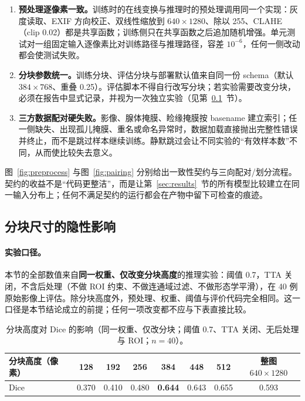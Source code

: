 \begin{enumerate}[label=\textbf{C\arabic*.}]
\item \textbf{预处理逐像素一致。}训练时的在线变换与推理时的预处理调用同一个实现：灰度读取、EXIF 方向校正、双线性缩放到 $640\times1280$、除以 255、CLAHE（clip 0.02）都是共享函数；训练侧只在共享函数之后追加随机增强。单元测试对一组固定输入逐像素比对训练路径与推理路径，容差 $10^{-6}$，任何一侧改动都会使测试失败。
\item \textbf{分块参数统一。}训练分块、评估分块与部署默认值来自同一份 schema（默认 $384\times768$、重叠 0.25）。评估脚本不得自行改写分块；若实验需要改变分块，必须在报告中显式记录，并视为一次独立实验（见第~\ref{sec:tiling}~节）。
\item \textbf{三方数据配对硬失败。}影像、腺体掩膜、睑缘掩膜按 basename 建立索引；任一侧缺失、出现孤儿掩膜、重名或命名异常时，数据加载直接抛出完整性错误并终止，而不是跳过样本继续训练。静默跳过会让不同实验的“有效样本数”不同，从而使比较失去意义。
\end{enumerate}

图~\ref{fig:preprocess} 与图~\ref{fig:pairing} 分别给出一致性契约与三向配对/划分流程。契约的收益不是“代码更整洁”，而是让第~\ref{sec:results}~节的所有模型比较建立在同一输入分布上；任何不满足契约的运行都会在产物中留下可检查的痕迹。



\subsection{分块尺寸的隐性影响}\label{sec:tiling}

\paragraph{实验口径。}本节的全部数值来自\textbf{同一权重、仅改变分块高度}的推理实验：阈值 0.7，TTA 关闭，不含后处理（不做 ROI 约束、不做连通域过滤、不做形态学平滑），在 40 例原始影像上评估。除分块高度外，预处理、权重、阈值与评价代码完全相同。这一口径是本节结论成立的前提；任何一项改变都不应与下表直接比较。

\begin{table}[t]
\centering
\caption{分块高度对 Dice 的影响（同一权重、仅改分块；阈值 0.7、TTA 关闭、无后处理与 ROI；$n=40$）。}
\label{tab:tiling}
\begin{tabular}{lccccccc}
\toprule
分块高度（像素） & 128 & 192 & 256 & 384 & 448 & 512 & 整图 $640\times1280$ \\
\midrule
Dice & 0.370 & 0.410 & 0.480 & \textbf{0.644} & 0.643 & 0.655 & 0.593 \\
\bottomrule
\end{tabular}
\end{table}

